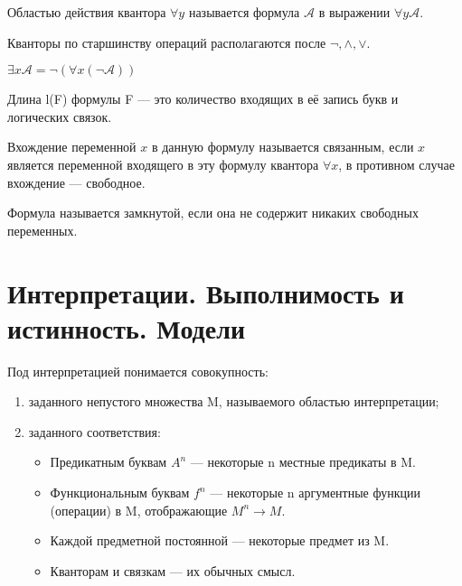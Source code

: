 Областью действия квантора $\forall y$ называется формула $\mathcal{A}$ в
выражении  $\forall y \mathcal{A}$.

Кванторы по старшинству операций располагаются после  $\lnot, \land, \lor$. 

$\exists x \mathcal{A} = \lnot\left( \forall x (\lnot \mathcal{A} )\right) $ 

\begin{definition}
	Длина l(F) формулы F --- это количество входящих в её запись букв и
	логических связок.
\end{definition}

\begin{definition}
	Вхождение переменной $x$ в данную формулу называется связанным, если
	$x$ является переменной входящего в эту формулу квантора $\forall x$, в
	противном случае вхождение --- свободное. 
\end{definition}

\begin{definition}
	Формула называется замкнутой, если она не содержит никаких свободных
	переменных.
\end{definition}

\section{Интерпретации. Выполнимость и истинность. Модели}
\begin{definition}
Под интерпретацией понимается совокупность:
\begin{enumerate}
	\item заданного непустого множества M, называемого областью
		интерпретации;
	\item заданного соответствия:
		\begin{itemize}
			\item Предикатным буквам $A^n$ --- некоторые n местные
				предикаты в M.
			\item Функциональным буквам $f^n$ --- некоторые n
				аргументные функции (операции) в M, отображающие
				$M^n  \to  M$.
			\item Каждой предметной постоянной --- некоторые предмет
				из M.
			\item Кванторам и связкам --- их обычных смысл.
		\end{itemize}
		
\end{enumerate}
\end{definition}

